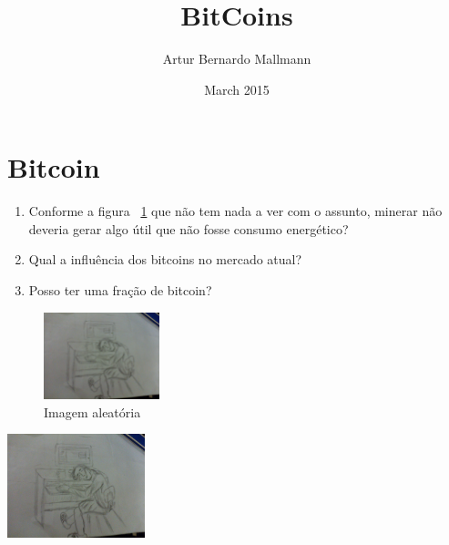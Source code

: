 \documentclass{article}
\title{BitCoins}
\author{Artur Bernardo Mallmann }
\date{March 2015}
\begin{document}
\maketitle

\section{Bitcoin}

\begin{enumerate}
\item Conforme a figura ~\ref{fig:my_label} que não tem nada a ver com o assunto, minerar não deveria gerar algo útil que não fosse consumo energético?
\item Qual a influência dos bitcoins no mercado atual?
\item Posso ter uma fração de bitcoin?
\end{enumerate}

\begin{figure}[h]
\centering
\includegraphics[width=0.3\textwidth]{desenho.jpg}
\caption{Imagem aleatória}
\label{fig:my_label}
\end{figure}

\includegraphics[width=0.3\textwidth]{desenho.jpg}
\end{document}
